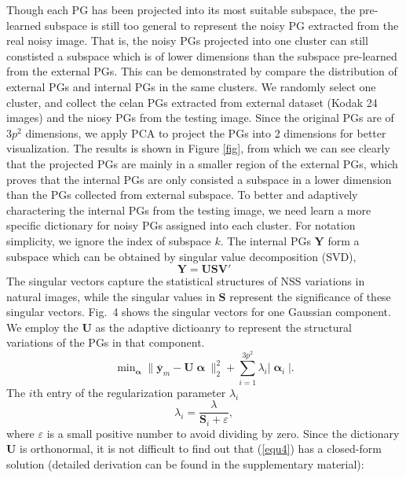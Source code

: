 \documentclass[10pt,twocolumn,letterpaper]{article}
\begin{document}
Though each PG has been projected into its most suitable subspace, the pre-learned subspace is still too general to represent the noisy PG extracted from the real noisy image. That is, the noisy PGs projected into one cluster can still constisted a subspace which is of lower dimensions than the subspace pre-learned from the external PGs. This can be demonstrated by compare the distribution of external PGs and internal PGs in the same clusters. We randomly select one cluster, and collect the celan PGs extracted from external dataset (Kodak 24 images) and the niosy PGs from the testing image. Since the original PGs are of $3p^{2}$ dimensions, we apply PCA to project the PGs into 2 dimensions for better visualization. The results is shown in Figure \ref{fig}, from which we can see clearly that the projected PGs are mainly in a smaller region of the external PGs, which proves that the internal PGs are only consisted a subspace in a lower dimension than the PGs collected from external subspace. To better and adaptively charactering the internal PGs from the testing image, we need learn a more specific dictionary for noisy PGs assigned into each cluster. For notation simplicity, we ignore the index of subspace $k$. The internal PGs $\mathbf{Y}$ form a subspace which can be obtained by singular value decomposition (SVD),
\begin{equation}\label{equ4}
\mathbf{Y}=\mathbf{U}\mathbf{S}\mathbf{V}'
\end{equation}
The singular vectors capture the statistical structures of NSS variations in natural images, while the singular values in $\mathbf{S}$ represent the significance of these singular vectors. Fig.\ 4 shows the singular vectors for one Gaussian component. We employ the $\mathbf{U}$ as the adaptive dictioanry to represent the structural variations of the PGs in that component.
\begin{equation}\label{equ5}
\min\nolimits_{\boldsymbol{\upalpha}}\|\mathbf{\overline{y}}_{m}-\mathbf{U}\boldsymbol{\upalpha}\|_{2}^{2}+\sum_{i=1}^{3p^{2}}\lambda_{i}|\boldsymbol{\upalpha}_{i}|.
\end{equation}
The $i$th entry of the regularization parameter $\lambda_{i}$ 
\begin{equation}\label{equ6}
\lambda_{i} = \frac{\lambda}{\mathbf{S}_{i}+\varepsilon},
\end{equation}
where $\varepsilon$ is a small positive number to avoid dividing by zero. Since the dictionary $\mathbf{U}$ is orthonormal, it is not difficult to find out that (\ref{equ4}) has a closed-form solution (detailed derivation can be found in the supplementary material):
\end{document}

